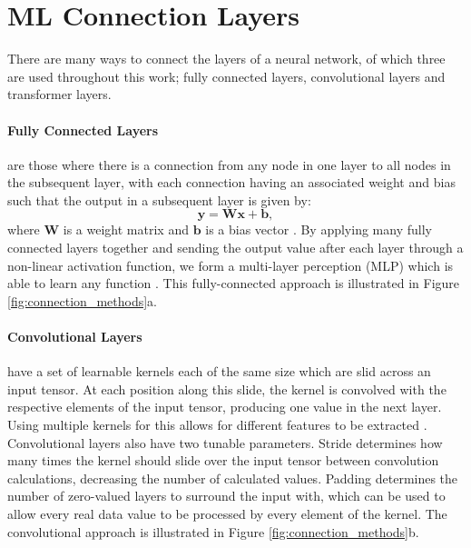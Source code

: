 \section{ML Connection Layers}
\label{appendix:ML_connections}

There are many ways to connect the layers of a neural network, of which three are used throughout this work; fully connected layers, convolutional layers and transformer layers.
\paragraph{Fully Connected Layers} \cite{minsky_perceptrons_2017,rosenblatt_principles_nodate} are those where there is a connection from any node in one layer to all nodes in the subsequent layer, with each connection having an associated weight and bias such that the output in a subsequent layer is given by:
\begin{equation}
    \boldsymbol{y} = \boldsymbol{W}\boldsymbol{x} + \boldsymbol{b},
\end{equation}
where $\boldsymbol{W}$ is a weight matrix and $\boldsymbol{b}$ is a bias vector \cite{rosenblatt_principles_nodate}. By applying many fully connected layers together and sending the output value after each layer through a non-linear activation function, we form a multi-layer perception (MLP) which is able to learn any function \cite{cybenko_approximation_1989,leshno_multilayer_1993,hornik_multilayer_1989}. This fully-connected approach is illustrated in Figure \ref{fig:connection_methods}a. \\

\noindent
\paragraph{Convolutional Layers} \cite{kiranyaz_1d_2019,lecun_gradient-based_1998,goodfellow_deep_2016} have a set of learnable kernels each of the same size which are slid across an input tensor. At each position along this slide, the kernel is convolved with the respective elements of the input tensor, producing one value in the next layer. Using multiple kernels for this allows for different features to be extracted \cite{dumoulin_guide_2018}. Convolutional layers also have two tunable parameters. Stride determines how many times the kernel should slide over the input tensor between convolution calculations, decreasing the number of calculated values. Padding determines the number of zero-valued layers to surround the input with, which can be used to allow every real data value to be processed by every element of the kernel. The convolutional approach is illustrated in Figure \ref{fig:connection_methods}b. \\

